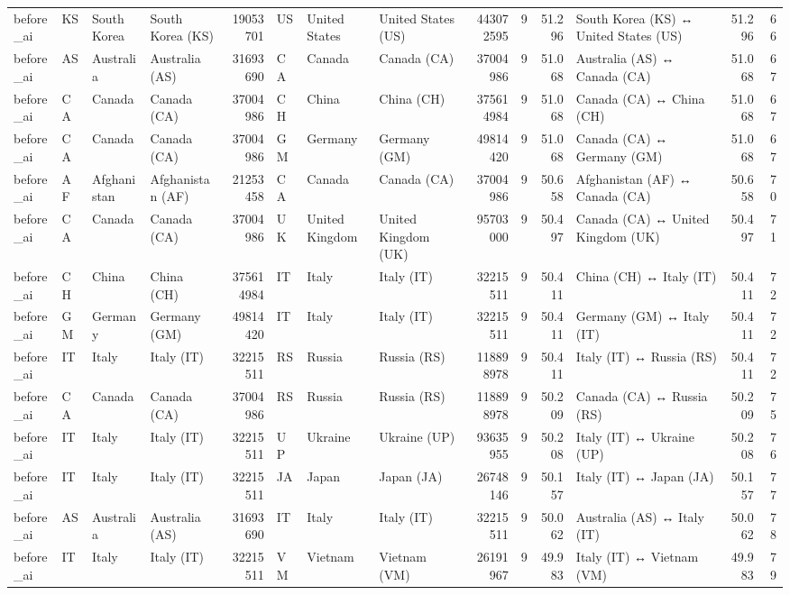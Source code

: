 \begin{tabular}{llllrlllrrrlrr}
before\_ai & KS & South Korea & South Korea (KS) & 19053701 & US & United States & United States (US) & 443072595 & 9 & 51.296 & South Korea (KS) ↔ United States (US) & 51.296 & 66 \\
before\_ai & AS & Australia & Australia (AS) & 31693690 & CA & Canada & Canada (CA) & 37004986 & 9 & 51.068 & Australia (AS) ↔ Canada (CA) & 51.068 & 67 \\
before\_ai & CA & Canada & Canada (CA) & 37004986 & CH & China & China (CH) & 375614984 & 9 & 51.068 & Canada (CA) ↔ China (CH) & 51.068 & 67 \\
before\_ai & CA & Canada & Canada (CA) & 37004986 & GM & Germany & Germany (GM) & 49814420 & 9 & 51.068 & Canada (CA) ↔ Germany (GM) & 51.068 & 67 \\
before\_ai & AF & Afghanistan & Afghanistan (AF) & 21253458 & CA & Canada & Canada (CA) & 37004986 & 9 & 50.658 & Afghanistan (AF) ↔ Canada (CA) & 50.658 & 70 \\
before\_ai & CA & Canada & Canada (CA) & 37004986 & UK & United Kingdom & United Kingdom (UK) & 95703000 & 9 & 50.497 & Canada (CA) ↔ United Kingdom (UK) & 50.497 & 71 \\
before\_ai & CH & China & China (CH) & 375614984 & IT & Italy & Italy (IT) & 32215511 & 9 & 50.411 & China (CH) ↔ Italy (IT) & 50.411 & 72 \\
before\_ai & GM & Germany & Germany (GM) & 49814420 & IT & Italy & Italy (IT) & 32215511 & 9 & 50.411 & Germany (GM) ↔ Italy (IT) & 50.411 & 72 \\
before\_ai & IT & Italy & Italy (IT) & 32215511 & RS & Russia & Russia (RS) & 118898978 & 9 & 50.411 & Italy (IT) ↔ Russia (RS) & 50.411 & 72 \\
before\_ai & CA & Canada & Canada (CA) & 37004986 & RS & Russia & Russia (RS) & 118898978 & 9 & 50.209 & Canada (CA) ↔ Russia (RS) & 50.209 & 75 \\
before\_ai & IT & Italy & Italy (IT) & 32215511 & UP & Ukraine & Ukraine (UP) & 93635955 & 9 & 50.208 & Italy (IT) ↔ Ukraine (UP) & 50.208 & 76 \\
before\_ai & IT & Italy & Italy (IT) & 32215511 & JA & Japan & Japan (JA) & 26748146 & 9 & 50.157 & Italy (IT) ↔ Japan (JA) & 50.157 & 77 \\
before\_ai & AS & Australia & Australia (AS) & 31693690 & IT & Italy & Italy (IT) & 32215511 & 9 & 50.062 & Australia (AS) ↔ Italy (IT) & 50.062 & 78 \\
before\_ai & IT & Italy & Italy (IT) & 32215511 & VM & Vietnam & Vietnam (VM) & 26191967 & 9 & 49.983 & Italy (IT) ↔ Vietnam (VM) & 49.983 & 79 \\

\end{tabular}
